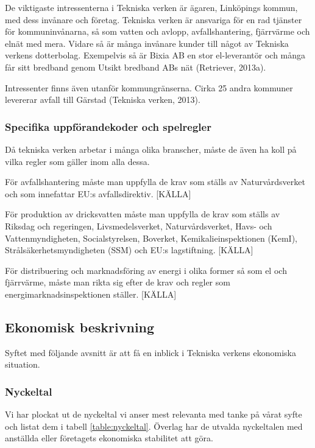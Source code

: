 \documentclass[10pt,a4paper]{article}
\begin{document}
De viktigaste intressenterna i Tekniska verken är ägaren, Linköpings kommun,
med dess invånare och företag. Tekniska verken är ansvariga för en rad tjänster
för kommuninvånarna, så som vatten och avlopp, avfallshantering, fjärrvärme och
elnät med mera. Vidare så är många invånare kunder till något av Tekniska
verkens dotterbolag. Exempelvis så är Bixia AB en stor el-leverantör och många
får sitt bredband genom Utsikt bredband ABs nät (Retriever, 2013a). 

Intressenter finns även utanför kommungränserna. Cirka 25 andra kommuner
levererar avfall till Gärstad (Tekniska verken, 2013).

\subsubsection{Specifika uppförandekoder och spelregler} 
Då tekniska verken arbetar i många olika branscher, måste de även ha koll på
vilka regler som gäller inom alla dessa.

För avfallshantering måste man uppfylla de krav som ställs av Naturvårdsverket och
som innefattar EU:s avfallsdirektiv. [KÄLLA]

För produktion av dricksvatten måste man uppfylla de krav som ställs av Riksdag
och regeringen, Livsmedelsverket, Naturvårdsverket, Havs- och Vattenmyndigheten,
Socialstyrelsen, Boverket, Kemikalieinspektionen (KemI), Strålsäkerhetsmyndigheten 
(SSM) och EU:s lagstiftning. [KÄLLA]

För distribuering och marknadsföring av energi i olika former så som el och
fjärrvärme, måste man rikta sig efter de krav och regler som
energimarknadsinspektionen ställer. [KÄLLA]


\subsection{Ekonomisk beskrivning}
Syftet med följande avsnitt är att få en inblick i Tekniska verkens ekonomiska
situation.

\subsubsection{Nyckeltal}
Vi har plockat ut de nyckeltal vi anser mest relevanta med tanke på vårat syfte och listat dem i tabell \ref{table:nyckeltal}. Överlag har de utvalda nyckeltalen med anställda eller företagets ekonomiska stabilitet att göra.
\end{document}
